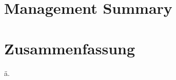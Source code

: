 \begingroup
\let\clearpage\relax
\let\cleardoublepage\relax
\let\cleardoublepage\relax

\chapter*{Management Summary}
\label{chap:managementSummary}


\vfill


\chapter*{Zusammenfassung}
{\"a}.

\endgroup


\vfill
